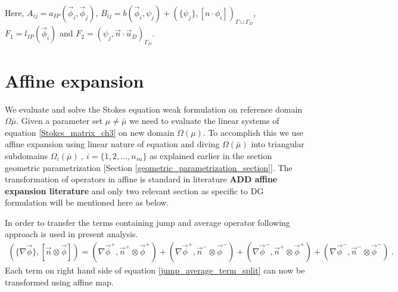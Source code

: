 \documentclass[graybox]{svmult}
\begin{document}
Here, $A_{ij} = a_{IP} (\overrightarrow{\phi}_i,\overrightarrow{\phi}_j)$, $B_{ij} = b(\overrightarrow{\phi}_i,\psi_j) + \left( \lbrace \psi_j \rbrace , [n \cdot \phi_i]\right)_{\Gamma \cup \Gamma_D}$, $F_1 = l_{IP}(\overrightarrow{\phi}_i)$ and $F_2 = \left( \psi_j,\overrightarrow{n} \cdot \overrightarrow{u}_D \right)_{\Gamma_D}$.

\section{Affine expansion}

We evaluate and solve the Stokes equation weak formulation on reference domain $\Omega{\bar{\mu}}$. Given a parameter set $\mu \neq \bar{\mu}$ we need to evaluate the linear systems of equation \eqref{Stokes_matrix_ch3} on new domain $\Omega(\mu)$. To accomplish this we use affine expansion using linear nature of equation and diving $\Omega(\bar{\mu})$ into triangular subdomains $\Omega_i(\bar{\mu}) \ , \ i = \lbrace 1,2,\ldots,n_{su} \rbrace$ as explained earlier in the section geometric parametrization [Section \ref{geometric_parametrization_section}]. The transformation of operators in affine is standard in literature \textbf{ADD affine expansion literature} and only two relevant section as specific to DG formulation will be mentioned here as below.

In order to transfer the terms containing jump and average operator following approach is used in present analysis.
\begin{equation}\label{jump_average_term_split}
\begin{split}
\left(\lbrace \nabla \overrightarrow{\phi} \rbrace , \left[ \overrightarrow{n} \otimes \overrightarrow{\phi}  \right]  \right) = \left( \nabla \overrightarrow{\phi}^+ , \overrightarrow{n}^+ \otimes \overrightarrow{\phi}^+ \right) + \left( \nabla \overrightarrow{\phi}^+ , \overrightarrow{n}^- \otimes \overrightarrow{\phi}^- \right) + \left( \nabla \overrightarrow{\phi}^- , \overrightarrow{n}^+ \otimes \overrightarrow{\phi}^+ \right) + \left( \nabla \overrightarrow{\phi}^- , \overrightarrow{n}^- \otimes \overrightarrow{\phi}^- \right) \ .
\end{split}
\end{equation}
Each term on right hand side of equation \eqref{jump_average_term_split} can now be transformed using affine map.
\end{document}
